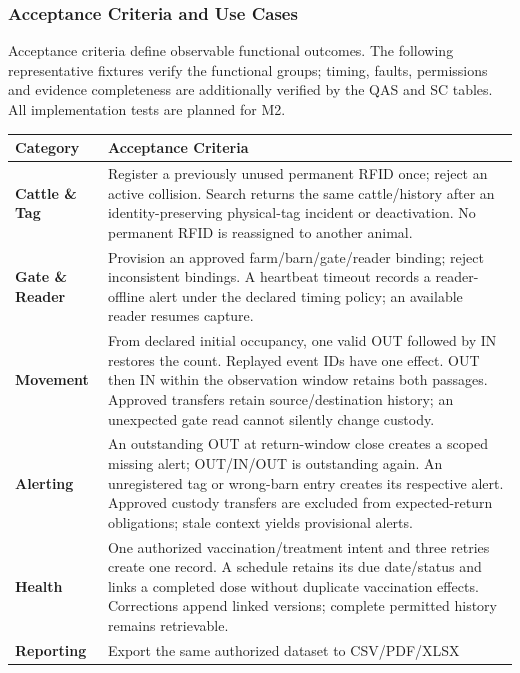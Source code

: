 \subsubsection{Acceptance Criteria and Use Cases}\label{sec:2.1.2}

Acceptance criteria define observable functional outcomes. The following
representative fixtures verify the functional groups; timing, faults,
permissions and evidence completeness are additionally verified by the
QAS and SC tables. All implementation tests are planned for M2.

{\small
\begin{longtable}[]{|>{\raggedright\arraybackslash}p{}|>{\raggedright\arraybackslash}p{}|}
\hline
\textbf{Category} & \textbf{Acceptance Criteria} \\ \hline
\endhead
\textbf{Cattle \& Tag} & Register a previously unused permanent RFID
once; reject an active collision. Search returns the same cattle/history
after an identity-preserving physical-tag incident or deactivation. No
permanent RFID is reassigned to another animal. \\ \hline
\textbf{Gate \& Reader} & Provision an approved farm/barn/gate/reader
binding; reject inconsistent bindings. A heartbeat timeout records a
reader-offline alert under the declared timing policy; an available
reader resumes capture. \\ \hline
\textbf{Movement} & From declared initial occupancy, one valid OUT
followed by IN restores the count. Replayed event IDs have one effect.
OUT then IN within the observation window retains both passages.
Approved transfers retain source/destination history; an unexpected gate
read cannot silently change custody. \\ \hline
\textbf{Alerting} & An outstanding OUT at return-window close creates a
scoped missing alert; OUT/IN/OUT is outstanding again. An unregistered
tag or wrong-barn entry creates its respective alert. Approved custody
transfers are excluded from expected-return obligations; stale context
yields provisional alerts. \\ \hline
\textbf{Health} & One authorized vaccination/treatment intent and three
retries create one record. A schedule retains its due date/status and
links a completed dose without duplicate vaccination effects.
Corrections append linked versions; complete permitted history remains
retrievable. \\ \hline
\textbf{Reporting} & Export the same authorized dataset to CSV/PDF/XLSX

\end{longtable}}
